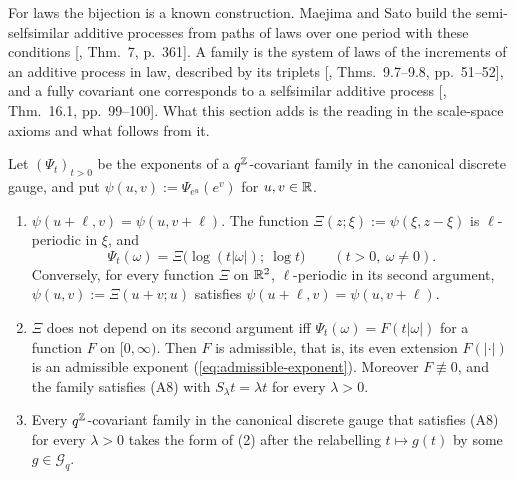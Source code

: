 For laws the bijection is a known construction. Maejima and Sato build the semi-selfsimilar
additive processes from paths of laws over one period with these conditions
[, Thm.~7, p.~361]. A family is the system of laws of the increments of an
additive process in law, described by its triplets [, Thms.~9.7--9.8,
pp.~51--52], and a fully covariant one corresponds to a selfsimilar additive process
[, Thm.~16.1, pp.~99--100]. What this section adds is the reading in the
scale-space axioms and what follows from it.

\begin{theorem}
\label{thm:annulus-parametrization-phase}

Let $(\Psi_t)_{t > 0}$ be the exponents of a $q^{\mathbb{Z}}$-covariant family in the canonical discrete
gauge, and put $\psi(u,v) := \Psi_{e^u}(e^v)$ for $u, v \in \mathbb{R}$.
\begin{enumerate}
\item $\psi(u + \ell, v) = \psi(u, v + \ell)$. The function $\Xi(z;\xi) := \psi(\xi, z - \xi)$ is
$\ell$-periodic in $\xi$, and
\[
  \Psi_t(\omega) = \Xi\bigl(\log(t|\omega|);\ \log t\bigr) \qquad (t > 0,\ \omega \ne 0).
\]
Conversely, for every function $\Xi$ on $\mathbb{R}^2$, $\ell$-periodic in its second argument,
$\psi(u,v) := \Xi(u + v; u)$ satisfies $\psi(u + \ell, v) = \psi(u, v + \ell)$.
\item $\Xi$ does not depend on its second argument iff $\Psi_t(\omega) = F(t|\omega|)$ for a
function $F$ on $[0,\infty)$. Then $F$ is admissible, that is, its even extension $F(|\cdot|)$ is an
admissible exponent (\ref{eq:admissible-exponent}). Moreover $F \not\equiv 0$, and the family
satisfies (A8) with $S_\lambda t = \lambda t$ for every $\lambda > 0$.
\item Every $q^{\mathbb{Z}}$-covariant family in the canonical discrete gauge that satisfies (A8) for
every $\lambda > 0$ takes the form of (2) after the relabelling $t \mapsto g(t)$ by some
$g \in \mathcal{G}_q$.
\end{enumerate}
\end{theorem}

